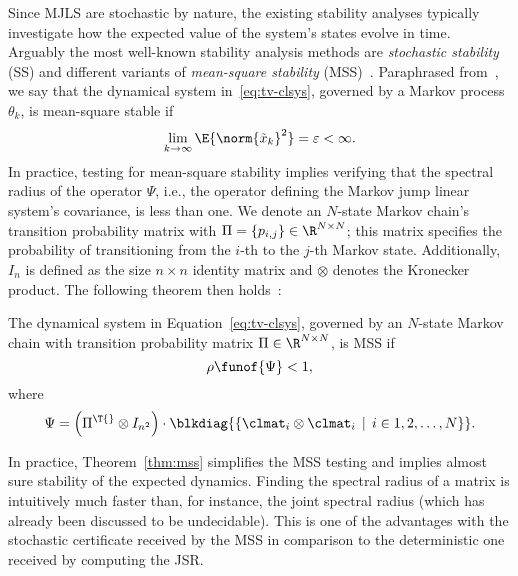 Since MJLS are stochastic by nature, the existing stability analyses typically investigate how the expected value of the system's states evolve in time.
Arguably the most well-known stability analysis methods are \emph{stochastic stability} (SS) and different variants of \emph{mean-square stability} (MSS)~\cite{Feng:1992}.
Paraphrased from~\cite{Costa:2005}, we say that the dynamical system in~\eqref{eq:tv-clsys}, governed by a Markov process $\theta_k$, is mean-square stable if
%
\begin{equation*}%
    \lim_{k\rightarrow \infty} \E{\norm{\tilde{x}_k}^2} = \varepsilon < \infty.
\end{equation*}
%
In practice, testing for mean-square stability implies verifying that the spectral radius of the operator $\Psi$, i.e., the operator defining the Markov jump linear system's covariance, is less than one.
We denote an $N$-state Markov chain's transition probability matrix with $\Pi = \left\{ p_{i,j} \right\} \in \R^{N \times N}$; this matrix specifies the probability of transitioning from the $i$-th to the $j$-th Markov state.
Additionally, $I_{n}$ is defined as the size $n \times n $ identity matrix and $\otimes$ denotes the Kronecker product.
The following theorem then holds~\cite{Costa:2005}:
%
\begin{theorem}%
    \label{thm:mss}%
    The dynamical system in Equation~\eqref{eq:tv-clsys}, governed by an $N$-state Markov chain with transition probability matrix $\Pi \in \R^{N \times N}$, is MSS if
    \begin{equation*}%
        \rho\funof{\Psi} < 1,
    \end{equation*}
    where
    \begin{equation*}%
        \Psi = \left( \Pi^\T{} \otimes I_{n^2} \right) \cdot \blkdiag{ \left\{ \clmat_i \otimes \clmat_i \, \mid \, i \in 1, 2, \ldots, N \right\} }.
    \end{equation*}
\end{theorem}
%
In practice, Theorem~\ref{thm:mss} simplifies the MSS testing and implies almost sure stability of the expected dynamics.
Finding the spectral radius of a matrix is intuitively much faster than, for instance, the joint spectral radius (which has already been discussed to be undecidable).
This is one of the advantages with the stochastic certificate received by the MSS in comparison to the deterministic one received by computing the JSR.



